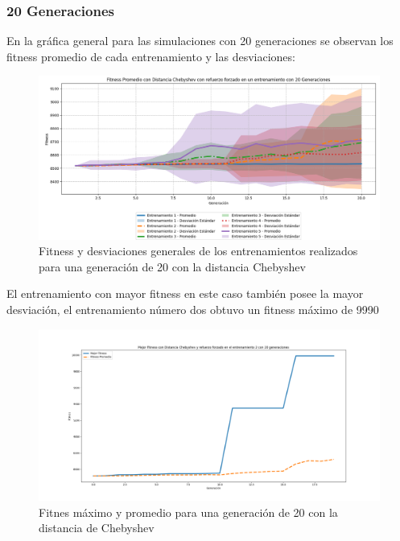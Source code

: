 \documentclass[conference]{IEEEtran}
\begin{document}
\subsubsection{20 Generaciones}
En la gráfica general para las
simulaciones con 20 generaciones se observan los fitness promedio de cada entrenamiento y las desviaciones:
\begin{figure}[H]
    \centering
    \includegraphics[width=1\linewidth]{Chebyshev/Fitness_Acumulado_Cheby_20Gen.png}
    \caption{Fitness y desviaciones generales de los entrenamientos realizados para una generación de 20 con la distancia Chebyshev}
    \label{fig:chy_20:genral}
\end{figure}
El entrenamiento con mayor fitness en este caso también posee la mayor desviación, el entrenamiento número dos obtuvo un fitness máximo de 9990
\begin{figure}[H]
    \centering
    \includegraphics[width=0.99\linewidth]{Chebyshev/Fitness_Individual_20Gen/Fitness_2_Cheby_20Gen.png}
    \caption{Fitnes máximo y promedio para una generación de 20 con la distancia de Chebyshev}
    \label{fig:max_cheby_20g}
\end{figure}
\end{document}
